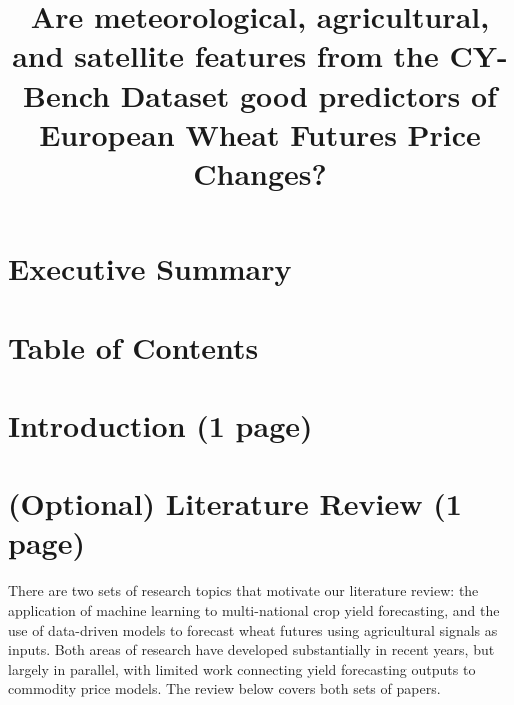 \documentclass[pdflatex,sn-mathphys-num, oneside]{sn-jnl}%
\theoremstyle{thmstyleone}%
\theoremstyle{thmstyletwo}%
\theoremstyle{thmstylethree}%
\begin{document}
\title[Article Title]{Are meteorological, agricultural, and satellite features from the CY-Bench Dataset good predictors of European Wheat Futures Price Changes?}


\author{}
\author{}
\author{}



\maketitle

\clearpage

\section{Executive Summary}\label{sec1}

\clearpage

\section{Table of Contents}\label{sec2}

\clearpage

\section{Introduction (1 page)}\label{sec3}

\clearpage

\section{(Optional) Literature Review (1 page)}\label{sec3}
There are two sets of research topics that motivate our literature review: the application of machine learning to multi-national crop yield forecasting, and the use of data-driven models to forecast wheat futures using agricultural signals as inputs. Both areas of research have developed substantially in recent years, but largely in parallel, with limited work connecting yield forecasting outputs to commodity price models. The review below covers both sets of papers.
 
\end{document}
